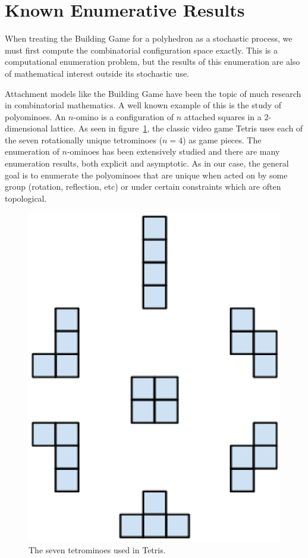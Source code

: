 \section{Known Enumerative Results}

When treating the Building Game for a polyhedron as a stochastic process, we must first compute the combinatorial configuration space exactly. This is a computational enumeration problem, but the results of this enumeration are also of mathematical interest outside its stochastic use.

Attachment models like the Building Game have been the topic of much research in combinatorial mathematics. A well known example of this is the study of polyominoes. An $n$-omino is a configuration of $n$ attached squares in a $2$-dimensional lattice. As seen in figure~\ref{fig:Tetris}, the classic video game Tetris uses each of the seven rotationally unique tetrominoes ($n = 4$) as game pieces. The enumeration of $n$-ominoes has been extensively studied and there are many enumeration results, both explicit and asymptotic. As in our case, the general goal is to enumerate the polyominoes that are unique when acted on by some group (rotation, reflection, etc) or under certain constraints which are often topological.
\begin{figure}[ht]
  \centering
  \includegraphics[scale=0.7, angle=0]{images/tetris.eps}
\caption{The seven tetrominoes used in Tetris.}
\label{fig:Tetris}
\end{figure}

